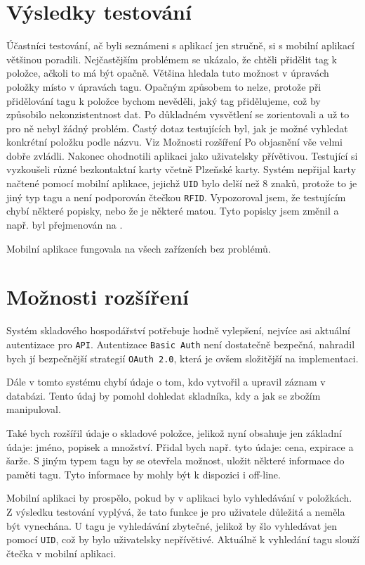 \documentclass[czech,BP]{thesiskiv}
\begin{document}
\section{Výsledky testování}
Účastníci testování, ač byli seznámeni s aplikací jen stručně, si s mobilní aplikací většinou poradili. Nejčastějším problémem se ukázalo, že chtěli přidělit tag k položce, ačkoli to má být opačně. Většina hledala tuto možnost v úpravách položky místo v úpravách tagu. Opačným způsobem to nelze, protože při přidělování tagu k položce bychom nevěděli, jaký tag přidělujeme, což by způsobilo nekonzistentnost dat. Po důkladném vysvětlení se zorientovali a už to pro ně nebyl žádný problém.   
Častý dotaz testujících byl, jak je možné vyhledat konkrétní položku podle názvu. Viz Možnosti rozšíření 
Po objasnění vše velmi dobře zvládli. Nakonec ohodnotili aplikaci jako uživatelsky přívětivou. Testující si vyzkoušeli různé bezkontaktní karty včetně Plzeňské karty. Systém nepřijal karty načtené pomocí mobilní aplikace, jejichž \texttt{UID} bylo delší než 8 znaků, protože to je jiný typ tagu a není podporován čtečkou \texttt{RFID}.   
Vypozoroval jsem, že testujícím chybí některé popisky, nebo že je některé matou. Tyto popisky jsem změnil a např.  byl přejmenován na .  

Mobilní aplikace fungovala na všech zařízeních bez problémů.


\section{Možnosti rozšíření}
Systém skladového hospodářství potřebuje hodně vylepšení, nejvíce asi aktuální autentizace pro \texttt{API}. Autentizace \texttt{Basic Auth} není dostatečně bezpečná, nahradil bych jí bezpečnější strategií \texttt{OAuth 2.0}, která je ovšem složitější na implementaci.

Dále v tomto systému chybí údaje o tom, kdo vytvořil a upravil záznam v databázi. Tento údaj by pomohl dohledat skladníka, kdy a jak se zbožím manipuloval.

Také bych rozšířil údaje o skladové položce, jelikož nyní obsahuje jen základní údaje: jméno, popisek a množství. Přidal bych např. tyto údaje: cena, expirace a šarže. 
S jiným typem tagu by se otevřela možnost, uložit některé informace do paměti tagu. Tyto informace by mohly být k dispozici i off-line. 

Mobilní aplikaci by prospělo, pokud by v aplikaci bylo vyhledávání v položkách. Z výsledku testování vyplývá, že tato funkce je pro uživatele důležitá a neměla být vynechána.
U tagu je vyhledávání zbytečné, jelikož by šlo vyhledávat jen pomocí \texttt{UID}, což by bylo uživatelsky nepřívětivé. Aktuálně k vyhledání tagu slouží čtečka v mobilní aplikaci. 
\end{document}
